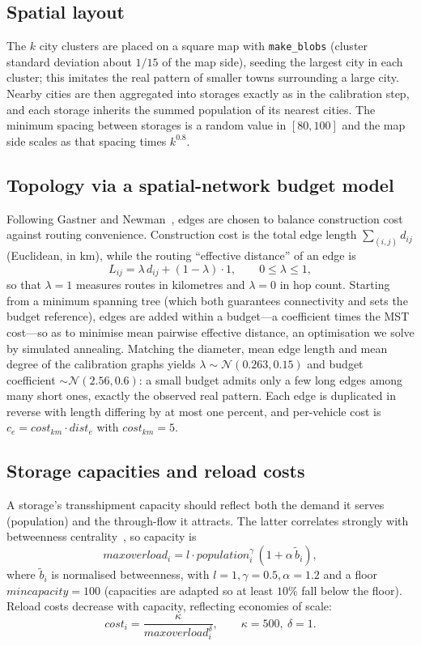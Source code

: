 \documentclass[11pt]{article}
\begin{document}
\subsection{Spatial layout}
The $k$ city clusters are placed on a square map with \texttt{make\_blobs}
(cluster standard deviation about $1/15$ of the map side), seeding the largest
city in each cluster; this imitates the real pattern of smaller towns
surrounding a large city. Nearby cities are then aggregated into storages exactly
as in the calibration step, and each storage inherits the summed population of
its nearest cities. The minimum spacing between storages is a random value in
$[80,100]$ and the map side scales as that spacing times $k^{0.8}$.

\subsection{Topology via a spatial-network budget model}
Following Gastner and Newman~\cite{gastner2006}, edges are chosen to balance
construction cost against routing convenience. Construction cost is the total
edge length $\sum_{(i,j)} d_{ij}$ (Euclidean, in km), while the routing
``effective distance'' of an edge is
\begin{equation}
L_{ij}=\lambda\,d_{ij}+(1-\lambda)\cdot 1, \qquad 0\le\lambda\le1,
\end{equation}
so that $\lambda=1$ measures routes in kilometres and $\lambda=0$ in hop count.
Starting from a minimum spanning tree (which both guarantees connectivity and
sets the budget reference), edges are added within a budget---a coefficient times
the MST cost---so as to minimise mean pairwise effective distance, an
optimisation we solve by simulated annealing. Matching the diameter, mean edge
length and mean degree of the calibration graphs yields
$\lambda\sim\mathcal{N}(0.263,0.15)$ and budget coefficient
$\sim\mathcal{N}(2.56,0.6)$: a small budget admits only a few long edges among
many short ones, exactly the observed real pattern. Each edge is duplicated in
reverse with length differing by at most one percent, and per-vehicle cost is
$c_e=cost_{km}\cdot dist_e$ with $cost_{km}=5$.

\subsection{Storage capacities and reload costs}
A storage's transshipment capacity should reflect both the demand it serves
(population) and the through-flow it attracts. The latter correlates strongly
with betweenness centrality~\cite{barthelemy2011,kirkley2018}, so capacity is
\begin{equation}
maxoverload_i=l\cdot population_i^{\gamma}\,(1+\alpha\,\tilde b_i),
\end{equation}
where $\tilde b_i$ is normalised betweenness, with $l=1,\gamma=0.5,\alpha=1.2$ and
a floor $mincapacity=100$ (capacities are adapted so at least $10\%$ fall below
the floor). Reload costs decrease with capacity, reflecting economies of scale:
\begin{equation}
cost_i=\frac{\kappa}{maxoverload_i^{\delta}}, \qquad \kappa=500,\ \delta=1.
\end{equation}
\end{document}
